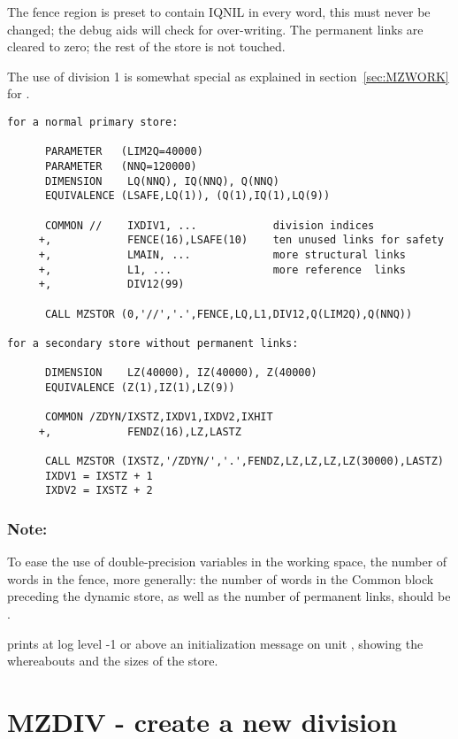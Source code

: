 The fence region is preset to contain IQNIL in every word, this must never be
changed; the debug aids will check for over-writing.  The permanent links are
cleared to zero; the rest of the store is not touched.

The use of division 1 is somewhat special as explained
in section~\ref{sec:MZWORK} for .

\Examples

\begin{verbatim}
for a normal primary store:

      PARAMETER   (LIM2Q=40000)
      PARAMETER   (NNQ=120000)
      DIMENSION    LQ(NNQ), IQ(NNQ), Q(NNQ)
      EQUIVALENCE (LSAFE,LQ(1)), (Q(1),IQ(1),LQ(9))

      COMMON //    IXDIV1, ...            division indices
     +,            FENCE(16),LSAFE(10)    ten unused links for safety
     +,            LMAIN, ...             more structural links
     +,            L1, ...                more reference  links
     +,            DIV12(99)

      CALL MZSTOR (0,'//','.',FENCE,LQ,L1,DIV12,Q(LIM2Q),Q(NNQ))

for a secondary store without permanent links:

      DIMENSION    LZ(40000), IZ(40000), Z(40000)
      EQUIVALENCE (Z(1),IZ(1),LZ(9))

      COMMON /ZDYN/IXSTZ,IXDV1,IXDV2,IXHIT
     +,            FENDZ(16),LZ,LASTZ

      CALL MZSTOR (IXSTZ,'/ZDYN/','.',FENDZ,LZ,LZ,LZ,LZ(30000),LASTZ)
      IXDV1 = IXSTZ + 1
      IXDV2 = IXSTZ + 2
\end{verbatim} 

\subsubsection*{Note:} 
To ease the use of double-precision variables in the working space,
the number of words in the fence, more generally: the number of words in the
Common block preceding the dynamic store, as well as the number of permanent
links, should be .

 prints at log level -1 or above
an initialization message on unit ,
showing the whereabouts and the sizes of the store.

\section{MZDIV  - create a new division}

